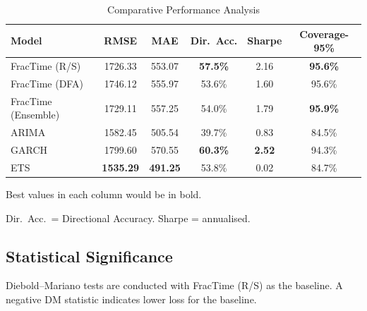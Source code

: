 \documentclass[12pt,a4paper]{article}
\begin{document}
\begin{table}[htbp]
  \centering
  \caption{Comparative Performance Analysis}
  \label{tab:main_results}
  \begin{threeparttable}
  \begin{tabular}{lccccc}
    \toprule
    \textbf{Model} & \textbf{RMSE} & \textbf{MAE} & \textbf{Dir.\ Acc.} &
    \textbf{Sharpe} & \textbf{Coverage-95\%} \\
    \midrule
    FracTime (R/S)      & 1726.33 & 553.07 & \textbf{57.5\%} & 2.16 & \textbf{95.6\%} \\
    FracTime (DFA)      & 1746.12 & 555.97 & 53.6\% & 1.60 & 95.6\% \\
    FracTime (Ensemble) & 1729.11 & 557.25 & 54.0\% & 1.79 & \textbf{95.9\%} \\
    ARIMA               & 1582.45 & 505.54 & 39.7\% & 0.83 & 84.5\% \\
    GARCH               & 1799.60 & 570.55 & \textbf{60.3\%} & \textbf{2.52} & 94.3\% \\
    ETS                 & \textbf{1535.29} & \textbf{491.25} & 53.8\% & 0.02 & 84.7\% \\
    \bottomrule
  \end{tabular}
  \begin{tablenotes}\small
    \item Best values in each column would be in bold.
    \item Dir.\ Acc.\ = Directional Accuracy.  Sharpe = annualised.
  \end{tablenotes}
  \end{threeparttable}
\end{table}

\subsection{Statistical Significance}

Diebold--Mariano tests are conducted with FracTime (R/S) as the baseline.
A negative DM statistic indicates lower loss for the baseline.
\end{document}
